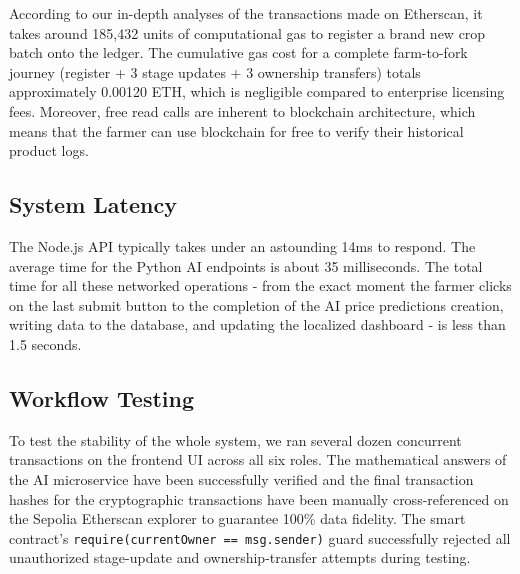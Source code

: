 \documentclass[conference]{IEEEtran}
\begin{document}
\begin{table}[htbp]
\caption{FarmChain Smart Contract Execution \& Gas Metrics on Sepolia}
\label{tab:gas_metrics}
\centering
{}
\end{table}

According to our in-depth analyses of the transactions made on Etherscan, it takes around 185,432 units of computational gas to register a brand new crop batch onto the ledger. The cumulative gas cost for a complete farm-to-fork journey (register + 3 stage updates + 3 ownership transfers) totals approximately 0.00120 ETH, which is negligible compared to enterprise licensing fees. Moreover, free read calls are inherent to blockchain architecture, which means that the farmer can use blockchain for free to verify their historical product logs.

\subsection{System Latency}
The Node.js API typically takes under an astounding 14ms to respond. The average time for the Python AI endpoints is about 35 milliseconds. The total time for all these networked operations - from the exact moment the farmer clicks on the last submit button to the completion of the AI price predictions creation, writing data to the database, and updating the localized dashboard - is less than 1.5 seconds.

\subsection{Workflow Testing}
To test the stability of the whole system, we ran several dozen concurrent transactions on the frontend UI across all six roles. The mathematical answers of the AI microservice have been successfully verified and the final transaction hashes for the cryptographic transactions have been manually cross-referenced on the Sepolia Etherscan explorer to guarantee 100\% data fidelity. The smart contract's \texttt{require(currentOwner == msg.sender)} guard successfully rejected all unauthorized stage-update and ownership-transfer attempts during testing.
\end{document}

